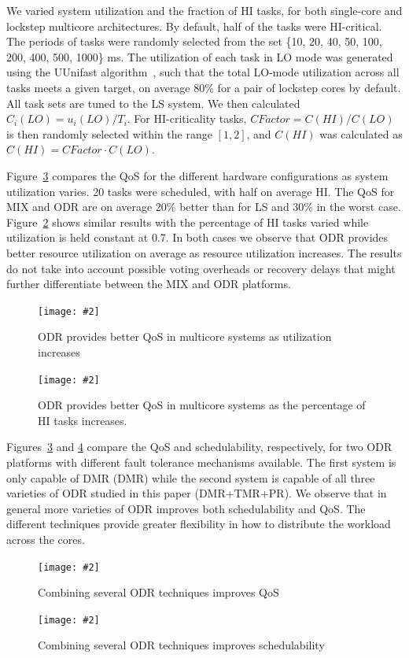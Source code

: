 \documentclass[conference]{IEEEtran}
\newcommand{\addfigure}[4]{
\begin{figure}[fh]
	\centering
	\texttt{[image: \#2]}
	\caption{#3}
	\label{#4}
\end{figure}
}
\begin{document}
	We varied system utilization and the fraction of HI tasks, for both single-core and lockstep multicore architectures.
	By default, half of the tasks were HI-critical. The periods of tasks were randomly selected from the set \{10, 20, 40, 50, 100, 200, 400, 500, 1000\} ms.
	The utilization of each task in LO mode was generated using the UUnifast algorithm~\cite{bini2005measuring}, such that the total LO-mode utilization across all tasks meets a given target, on average $80\%$ for a pair of lockstep cores by default. All task sets are tuned to the LS system. 
	We then calculated $C_i(LO) =  u_i(LO)/T_i$. 
	For HI-criticality tasks, $CFactor=C(HI)/C(LO)$ is then randomly selected within the range $[1, 2]$, and $C(HI)$ was calculated as $C(HI)=CFactor \cdot C(LO)$.
	
	Figure~\ref{f:mc-mec-qos-hi} compares the QoS for the different hardware configurations as system utilization varies. 20 tasks were scheduled, with half on average HI. The QoS for MIX and ODR are on average 20\% better than for LS and 30\% in the worst case. Figure~\ref{f:mc-hitasks} shows similar results with the percentage of HI tasks varied while utilization is held constant at 0.7. In both cases we observe that ODR provides better resource utilization on average as resource utilization increases. The results do not take into account possible voting overheads or recovery delays that might further differentiate between the MIX and ODR platforms. 
	
	\addfigure{0}{platform-qos.png}{ODR provides better QoS in multicore systems as utilization increases}{f:mc-mec-qos-hi}
	\addfigure{0}{hitask.png}{ODR provides better QoS in multicore systems as the percentage of HI tasks increases.}{f:mc-hitasks}
	
	Figures~\ref{f:mc-mec-qos-hi} and \ref{f:mc-mec-sched} compare the QoS and schedulability, respectively, for two ODR platforms with different fault tolerance mechanisms available. The first system is only capable of DMR (DMR) while the second system is capable of all three varieties of ODR studied in this paper (DMR+TMR+PR). We observe that in general more varieties of ODR improves both schedulability and QoS. The different techniques provide greater flexibility in how to distribute the workload across the cores. 
	
	\addfigure{0}{mec-qos.png}{Combining several ODR techniques improves QoS}{f:mc-mec-qos-hi}
	\addfigure{0}{mec-sched.png}{Combining several ODR techniques improves schedulability}{f:mc-mec-sched}
	
\end{document}
